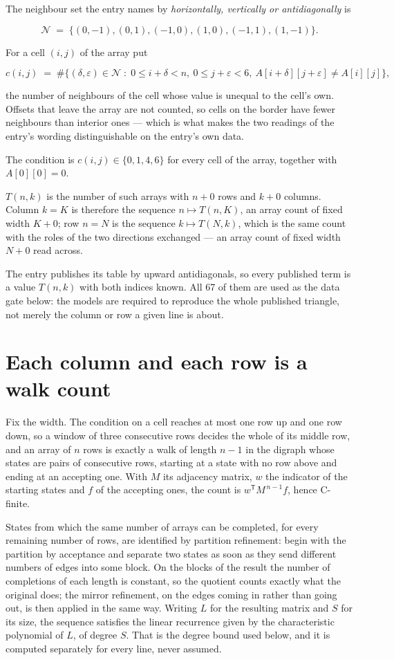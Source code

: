 \documentclass[11pt]{article}
\theoremstyle{definition}
\begin{document}
The neighbour set the entry names by {\itshape horizontally, vertically or antidiagonally} is

\[\mathcal{N} \;=\; \{(0,-1), (0,1), (-1,0), (1,0), (-1,1), (1,-1)\}.\]

For a cell $(i,j)$ of the array put

\[c(i,j) \;=\; \#\bigl\{(\delta,\varepsilon)\in\mathcal{N} \;:\; 0\le i+\delta<n,\ 0\le j+\varepsilon<6,\ A[i+\delta][j+\varepsilon] \neq A[i][j]\bigr\},\]

the number of neighbours of the cell whose value is unequal to the cell's own. Offsets that leave the array are not counted, so cells on the border have fewer neighbours than interior ones --- which is what makes the two readings of the entry's wording distinguishable on the entry's own data.

The condition is $c(i,j) \in \{0, 1, 4, 6\}$ for every cell of the array, together with $A[0][0]=0$.

$T(n,k)$ is the number of such arrays with $n + 0$ rows and $k + 0$ columns. Column $k = K$ is therefore the sequence $n \mapsto T(n,K)$, an array count of fixed width $K + 0$; row $n = N$ is the sequence $k \mapsto T(N,k)$, which is the same count with the roles of the two directions exchanged --- an array count of fixed width $N + 0$ read across.

The entry publishes its table by upward antidiagonals, so every published term is a value $T(n,k)$ with both indices known. All 67 of them are used as the data gate below: the models are required to reproduce the whole published triangle, not merely the column or row a given line is about.

\section{Each column and each row is a walk count}

Fix the width. The condition on a cell reaches at most one row up and one row down, so a window of three consecutive rows decides the whole of its middle row, and an array of $n$ rows is exactly a walk of length $n-1$ in the digraph whose states are pairs of consecutive rows, starting at a state with no row above and ending at an accepting one. With $M$ its adjacency matrix, $w$ the indicator of the starting states and $f$ of the accepting ones, the count is $w^{\mathsf T}M^{\,n-1}f$, hence C-finite.

States from which the same number of arrays can be completed, for every remaining number of rows, are identified by partition refinement: begin with the partition by acceptance and separate two states as soon as they send different numbers of edges into some block. On the blocks of the result the number of completions of each length is constant, so the quotient counts exactly what the original does; the mirror refinement, on the edges coming in rather than going out, is then applied in the same way. Writing $L$ for the resulting matrix and $S$ for its size, the sequence satisfies the linear recurrence given by the characteristic polynomial of $L$, of degree $S$. That is the degree bound used below, and it is computed separately for every line, never assumed.
\end{document}

